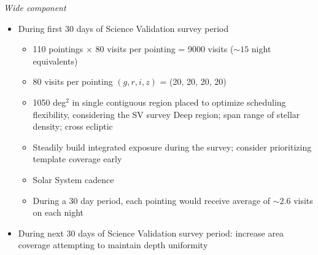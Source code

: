 \textit{Wide component}

\begin{itemize}

        \item During first 30 days of Science Validation survey period

        \begin{itemize}

                \item 110 pointings $\times$ 80 visits per pointing = 9000 visits ($\sim15$ night equivalents)
                \item 80 visits per pointing $(g, r, i, z)$ = (20, 20, 20, 20)
                \item 1050 deg$^2$  in single contiguous region placed to optimize scheduling flexibility, considering the SV survey Deep region; span range of stellar density; cross ecliptic
                \item Steadily build integrated exposure during the survey; consider prioritizing template coverage early
                \item Solar System cadence
                \item During a 30 day period, each pointing would receive average of $\sim2.6$ visits on each night

        \end{itemize}

        \item During next 30 days of Science Validation survey period: increase area coverage attempting to maintain depth uniformity

\end{itemize}



